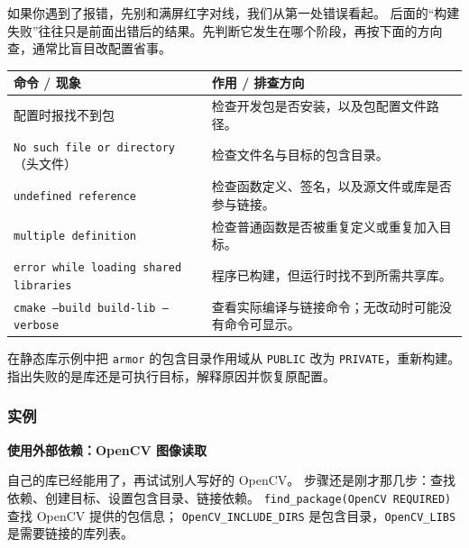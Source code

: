 如果你遇到了报错，先别和满屏红字对线，我们从第一处错误看起。
后面的“构建失败”往往只是前面出错后的结果。先判断它发生在哪个阶段，再按下面的方向查，通常比盲目改配置省事。
\begin{center}
\begin{tabular}{p{}p{}}
\toprule[1.5pt]
命令 / 现象 & 作用 / 排查方向 \\
\midrule[1pt]
配置时报找不到包 & 检查开发包是否安装，以及包配置文件路径。\\
\texttt{No such file or directory}（头文件） & 检查文件名与目标的包含目录。\\
\texttt{undefined reference} & 检查函数定义、签名，以及源文件或库是否参与链接。\\
\texttt{multiple definition} & 检查普通函数是否被重复定义或重复加入目标。\\
\texttt{error while loading shared libraries} & 程序已构建，但运行时找不到所需共享库。\\
\texttt{cmake --build build-lib --verbose} & 查看实际编译与链接命令；无改动时可能没有命令可显示。\\
\bottomrule[1.5pt]
\end{tabular}
\end{center}

\begin{exercise}\label{ex:v1-build-public-scope}
在静态库示例中把 \texttt{armor} 的包含目录作用域从 \texttt{PUBLIC} 改为 \texttt{PRIVATE}，重新构建。
指出失败的是库还是可执行目标，解释原因并恢复原配置。
\end{exercise}

\subsubsection{实例}
\label{sec:cmake-opencv}

\textbf{使用外部依赖：OpenCV 图像读取}

自己的库已经能用了，再试试别人写好的 OpenCV。
步骤还是刚才那几步：查找依赖、创建目标、设置包含目录、链接依赖。
\texttt{find\_package(OpenCV REQUIRED)} 查找 OpenCV 提供的包信息；
\texttt{OpenCV\_INCLUDE\_DIRS} 是包含目录，\texttt{OpenCV\_LIBS} 是需要链接的库列表。

